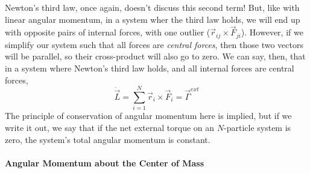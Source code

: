 \documentclass[a4paper]{article}
\begin{document}
Newton's third law, once again, doesn't discuss this second term! But, like
with linear angular momentum, in a system wher the third law holds, we will
end up with opposite pairs of internal forces, with one outlier
($\vec{r}_{ij}\times\vec{F}_{ji}$). However, if we simplify our system such that
all forces are \emph{central forces}, then those two vectors will be
parallel, so their cross-product will also go to zero. We can say, then, that
in a system where Newton's third law holds, and all internal forces are central
forces,
\[
    \dot{\vec{L}} = \sum_{i=1}^N \vec{r}_i\times\vec{F}_i = \vec{\Gamma}^{ext}
\]
The principle of conservation of angular momentum here is implied, but if we
write it out, we say that if the net external torque on an $N$-particle system
is zero, the system's total angular momentum is constant.

\paragraph{Angular Momentum about the Center of Mass}

\begin{figure}
    \centering
\end{figure}
\end{document}
